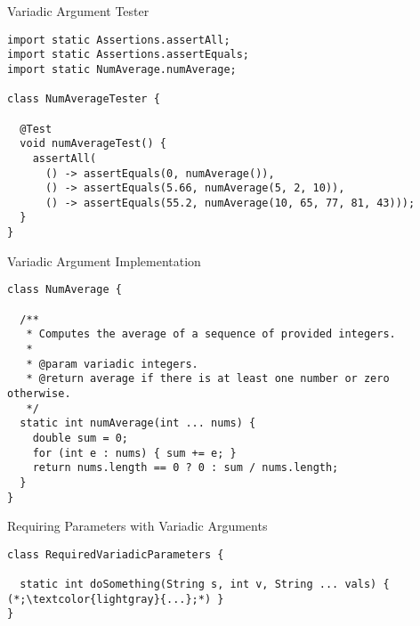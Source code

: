 
\begin{cl}[]{Variadic Argument  Tester}
\begin{lstlisting}[language=MyJava]
import static Assertions.assertAll;
import static Assertions.assertEquals;
import static NumAverage.numAverage;

class NumAverageTester {

  @Test
  void numAverageTest() {
    assertAll(
      () -> assertEquals(0, numAverage()),
      () -> assertEquals(5.66, numAverage(5, 2, 10)),
      () -> assertEquals(55.2, numAverage(10, 65, 77, 81, 43)));
  }
}
\end{lstlisting}
\end{cl}

\begin{cl}[]{Variadic Argument  Implementation}
\begin{lstlisting}[language=MyJava]
class NumAverage {

  /**
   * Computes the average of a sequence of provided integers.
   *
   * @param variadic integers.
   * @return average if there is at least one number or zero otherwise.
   */
  static int numAverage(int ... nums) {
    double sum = 0;
    for (int e : nums) { sum += e; }
    return nums.length == 0 ? 0 : sum / nums.length;
  }
}
\end{lstlisting}
\end{cl}


\begin{cl}[]{Requiring Parameters with Variadic Arguments}
\begin{lstlisting}[language=MyJava]
class RequiredVariadicParameters {

  static int doSomething(String s, int v, String ... vals) { (*;\textcolor{lightgray}{...};*) }
}
\end{lstlisting}
\end{cl}

